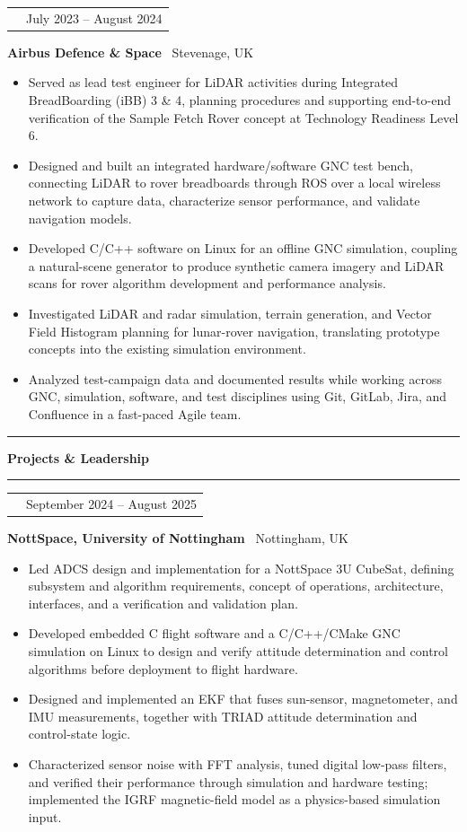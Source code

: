\documentclass[10pt,a4paper]{article}
\makeatletter
\newcommand{\SectionSize}{11.5pt}
\newcommand{\RoleSize}{10.3pt}
\newcommand{\CompanySize}{9.6pt}
\newcommand{\DurationSize}{9pt}
\newcommand{\BodySize}{9.2pt}
\newcommand{\SectionLineSize}{12pt}
\newcommand{\RoleLineSize}{11.5pt}
\newcommand{\CompanyLineSize}{10.8pt}
\newcommand{\DurationLineSize}{9pt}
\newcommand{\BodyLineSize}{11pt}
\newcommand{\SectionBefore}{4pt}
\newcommand{\SectionLineToTitle}{0pt}
\newcommand{\SectionTitleToLine}{2pt}
\newcommand{\SectionLineToEntry}{0pt}
\newcommand{\EntryBefore}{0pt}
\newcommand{\RoleToCompany}{-5pt}
\newcommand{\CompanyToBullets}{3pt}
\newcommand{\EntryAfter}{6pt}
\newcommand{\BulletSpacing}{2pt}
\newcommand{\BulletBefore}{0pt}
\newcommand{\BulletIndent}{1.25em}
\newcommand{\SectionLineThickness}{1.5pt}
\newcommand{\SubsectionLineThickness}{0.4pt}
\newcommand{\DurationWidth}{4.5cm}
\newcommand{\CVSection}[1]{

    \vspace{\SectionBefore}


    \noindent
    \textcolor{CVBlack}{
        \rule{\textwidth}{\SectionLineThickness}
    }

    \vspace{\SectionLineToTitle}


    {\fontsize{\SectionSize}{\SectionLineSize}
    \selectfont
    \textbf{\textcolor{CVBlack}{#1}}}

    \vspace{\SectionTitleToLine}


    \noindent
    \textcolor{CVLightGray}{
        \rule{\textwidth}{\SubsectionLineThickness}
    }

    \vspace{\SectionLineToEntry}
}
\newcommand{\CVEntry}[5]{

    \vspace{\EntryBefore}


    \noindent
    \begin{tabularx}{\textwidth}{
        @{}
        >{\raggedright\arraybackslash}X
        >{\raggedleft\arraybackslash}p{\DurationWidth}
        @{}
    }

        {\fontsize{\RoleSize}{\RoleLineSize}
        \selectfont
        \textbf{\textcolor{CVBlack}{#1}}}
        &
        {\fontsize{\DurationSize}{\DurationLineSize}
        \selectfont
        \textcolor{CVGray}{#4}}

    \end{tabularx}

    \vspace{\RoleToCompany}


    \noindent
    {\fontsize{\CompanySize}{\CompanyLineSize}
    \selectfont
    \textbf{\textcolor{CVDarkGray}{#2}}
    \textcolor{CVGray}{\textbar\ #3}}

    \vspace{\CompanyToBullets}


    \begin{itemize}[
        leftmargin=\BulletIndent,
        itemsep=\BulletSpacing,
        topsep=\BulletBefore,
        parsep=0pt,
        partopsep=0pt
    ]
        #5
    \end{itemize}

    \vspace{\EntryAfter}
}
\newcommand{\CVBullet}[1]{
    \item
    {\fontsize{\BodySize}{\BodyLineSize}
    \selectfont
    \textcolor{CVDarkGray}{#1}}
}
\makeatother
\begin{document}
\CVEntry
{AOCS/GNC Engineer Intern}
{Airbus Defence \& Space}
{Stevenage, UK}
{July 2023 -- August 2024}
{
    \CVBullet{Served as lead test engineer for LiDAR activities during Integrated BreadBoarding (iBB) 3 \& 4, planning procedures and supporting end-to-end verification of the Sample Fetch Rover concept at Technology Readiness Level 6.}

    \CVBullet{Designed and built an integrated hardware/software GNC test bench, connecting LiDAR to rover breadboards through ROS over a local wireless network to capture data, characterize sensor performance, and validate navigation models.}

    \CVBullet{Developed C/C++ software on Linux for an offline GNC simulation, coupling a natural-scene generator to produce synthetic camera imagery and LiDAR scans for rover algorithm development and performance analysis.}

    \CVBullet{Investigated LiDAR and radar simulation, terrain generation, and Vector Field Histogram planning for lunar-rover navigation, translating prototype concepts into the existing simulation environment.}

    \CVBullet{Analyzed test-campaign data and documented results while working across GNC, simulation, software, and test disciplines using Git, GitLab, Jira, and Confluence in a fast-paced Agile team.}
}


\CVSection{Projects \& Leadership}

\CVEntry
{JamSail 3U CubeSat -- AOCS/ADCS Lead}
{NottSpace, University of Nottingham}
{Nottingham, UK}
{September 2024 -- August 2025}
{
    \CVBullet{Led ADCS design and implementation for a NottSpace 3U CubeSat, defining subsystem and algorithm requirements, concept of operations, architecture, interfaces, and a verification and validation plan.}

    \CVBullet{Developed embedded C flight software and a C/C++/CMake GNC simulation on Linux to design and verify attitude determination and control algorithms before deployment to flight hardware.}

    \CVBullet{Designed and implemented an EKF that fuses sun-sensor, magnetometer, and IMU measurements, together with TRIAD attitude determination and control-state logic.}

    \CVBullet{Characterized sensor noise with FFT analysis, tuned digital low-pass filters, and verified their performance through simulation and hardware testing; implemented the IGRF magnetic-field model as a physics-based simulation input.}
}
\end{document}
